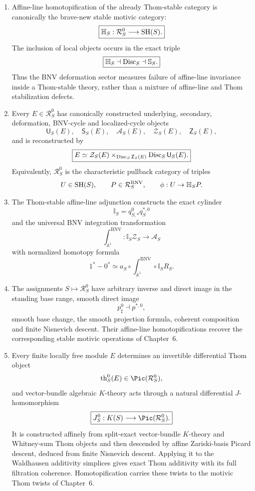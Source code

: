 \begin{theorem}
\begin{enumerate}
\item Affine-line homotopification of the already Thom-stable category is
canonically the brave-new stable motivic category:
\[
  \boxed{
  \mathbb H_S:\mathcal R_S^0\longrightarrow\mathrm{SH}(S).
  }
\]
The inclusion of local objects occurs in the exact triple
\[
  \boxed{
  \mathbb H_S\dashv\operatorname{Disc}_S\dashv\mathbb S_S.
  }
\]
Thus the BNV deformation sector measures failure of affine-line invariance
inside a Thom-stable theory, rather than a mixture of affine-line and Thom
stabilization defects.

\item Every \(E\in\mathcal R_S^0\) has canonically constructed underlying,
secondary, deformation, BNV-cycle and localized-cycle objects
\[
  \mathsf U_S(E),\quad
  \mathsf S_S(E),\quad
  \mathcal A_S(E),\quad
  \mathcal Z_S(E),\quad
  \mathsf Z_S(E),
\]
and is reconstructed by
\[
  \boxed{
  E
  \simeq
  \mathcal Z_S(E)
  \times_{\operatorname{Disc}_S\mathsf Z_S(E)}
  \operatorname{Disc}_S\mathsf U_S(E).
  }
\]
Equivalently, \(\mathcal R_S^0\) is the characteristic pullback category of
triples
\[
  U\in\mathrm{SH}(S),
  \qquad
  P\in\mathcal R_S^{\mathrm{BNV}},
  \qquad
  \phi:U\to\mathbb H_SP.
\]

\item The Thom-stable affine-line adjunction constructs the exact cylinder
\[
  \mathbb I_S=q_{S,*}^0q_S^{*,0}
\]
and the universal BNV integration transformation
\[
  \boxed{
  \int_{\mathbb A^1}^{\mathrm{BNV}}:
  \mathbb I_S\mathcal Z_S
  \longrightarrow
  \mathcal A_S
  }
\]
with normalized homotopy formula
\[
  1^*-0^*
  \simeq
  a_S\circ
  \int_{\mathbb A^1}^{\mathrm{BNV}}
  \circ\mathbb I_SR_S.
\]

\item The assignments \(S\mapsto\mathcal R_S^0\) have arbitrary inverse and
direct image in the standing base range, smooth direct image
\[
  p_\sharp^0\dashv p^{*,0},
\]
smooth base change, the smooth projection formula, coherent composition and
finite Nisnevich descent.  Their affine-line homotopifications recover the
corresponding stable motivic operations of Chapter~6.

\item Every finite locally free module \(E\) determines an invertible
differential Thom object
\[
  \operatorname{th}_S^0(E)\in\Pic(\mathcal R_S^0),
\]
and vector-bundle algebraic \(K\)-theory acts through a natural differential
\(J\)-homomorphism
\[
  \boxed{
  J_S^0:K(S)\longrightarrow\Pic(\mathcal R_S^0).
  }
\]
It is constructed affinely from split-exact vector-bundle \(K\)-theory and
Whitney-sum Thom objects and then descended by affine Zariski-basis Picard
descent, deduced from finite Nisnevich descent.  Applying it to the Waldhausen additivity simplices gives exact
Thom additivity with its full filtration coherence.  Homotopification carries
these twists to the motivic Thom twists of Chapter~6.


\end{enumerate}
\end{theorem}
